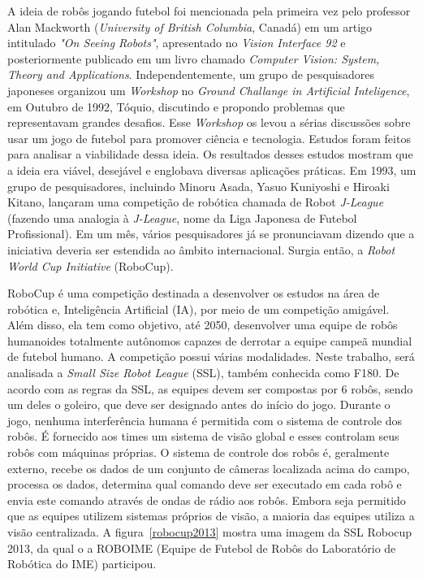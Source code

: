 A ideia de robôs jogando futebol foi mencionada pela primeira vez pelo professor
Alan Mackworth (\textit{University of British Columbia}, Canadá) em um artigo intitulado
\textit{"On Seeing Robots"}, apresentado no \textit{Vision Interface 92} e posteriormente publicado em
um livro chamado \textit{Computer Vision: System, Theory and Applications}. Independentemente,
um grupo de pesquisadores japoneses organizou um \textit{Workshop} no \textit{Ground Challange
in Artificial Inteligence}, em Outubro de 1992, Tóquio, discutindo e propondo problemas que
representavam grandes desafios. Esse \textit{Workshop} os levou a sérias discussões sobre
usar um jogo de futebol para promover ciência e tecnologia. Estudos foram feitos para
analisar a viabilidade dessa ideia. Os resultados desses estudos mostram que
a ideia era viável, desejável e englobava diversas aplicações práticas. Em 1993, um
grupo de pesquisadores, incluindo Minoru Asada, Yasuo Kuniyoshi e Hiroaki Kitano,
lançaram uma competição de robótica chamada de Robot \textit{J-League} (fazendo uma analogia à
\textit{J-League}, nome da Liga Japonesa de Futebol Profissional). Em um mês, vários
pesquisadores já se pronunciavam dizendo que a iniciativa deveria ser estendida ao
âmbito internacional. Surgia então, a \textit{Robot World Cup Initiative} (RoboCup).

RoboCup é uma competição destinada a desenvolver os estudos na área de robótica e,
Inteligência Artificial (IA), por meio de um competição amigável. Além disso, ela tem
como objetivo, até 2050, desenvolver uma equipe de robôs humanoides totalmente
autônomos capazes de derrotar a equipe campeã mundial de futebol humano. A competição
possui várias modalidades. Neste trabalho, será analisada a \textit{Small Size Robot League} (SSL),
também conhecida como F180. De acordo com as regras da SSL, as equipes devem ser
compostas por 6 robôs, sendo um deles o goleiro, que deve ser
designado antes do início do jogo. Durante o jogo, nenhuma interferência humana é
permitida com o sistema de controle dos robôs. É fornecido aos times um sistema de
visão global e esses controlam seus robôs com máquinas próprias. O sistema de controle
dos robôs é, geralmente externo, recebe os dados de um conjunto de câmeras
localizada acima do campo, processa os dados, determina qual comando deve ser executado
em cada robô e envia este comando através de ondas de rádio aos robôs. Embora seja
permitido que as equipes utilizem sistemas próprios de visão, a maioria das
equipes utiliza a visão centralizada. A figura~\ref{robocup2013} mostra uma
imagem da SSL Robocup 2013, da qual o a ROBOIME (Equipe de Futebol de Robôs do
Laboratório de Robótica do IME) participou.


